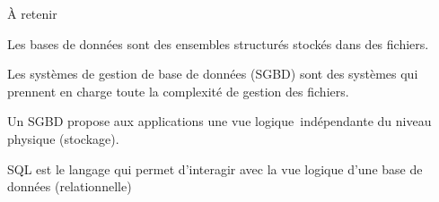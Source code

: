 \begin{frame}{À retenir}

Les \alert{bases de données} sont des ensembles structurés stockés dans des fichiers.

\vfill 

Les \alert{systèmes de gestion de base de données (SGBD)} sont des systèmes qui prennent en charge
toute la complexité de gestion des fichiers.

\vfill

\vfill 

Un SGBD propose aux applications une vue \alert{logique} indépendante du niveau \alert{physique} (stockage).

\vfill
\begin{blocgauche}
SQL est le langage qui permet d'interagir avec la vue logique d'une base de données (relationnelle)
\end{blocgauche}
\end{frame}

